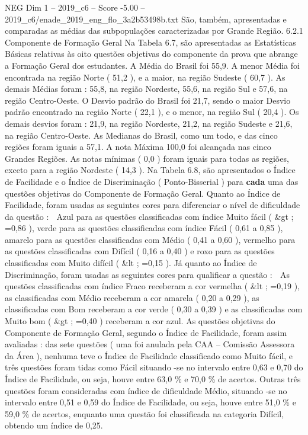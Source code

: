 \begin{textsample}{NEG Dim 1 – 2019\_c6 – Score -5.00 – 2019\_c6/enade\_2019\_eng\_flo\_3a2b53498b.txt}
São, também, apresentadas e comparadas as médias das subpopulações caracterizadas por Grande Região. 6.2.1 Componente de Formação Geral Na Tabela 6.7, são apresentadas as Estatísticas Básicas relativas às oito questões objetivas do componente da prova que abrange a Formação Geral dos estudantes.
A Média do Brasil foi 55,9.
A menor Média foi encontrada na região Norte ( 51,2 ), e a maior, na região Sudeste ( 60,7 ).
As demais Médias foram : 55,8, na região Nordeste, 55,6, na região Sul e 57,6, na região Centro-Oeste.
O Desvio padrão do Brasil foi 21,7, sendo o maior Desvio padrão encontrado na região Norte ( 22,1 ), e o menor, na região Sul ( 20,4 ).
Os demais desvios foram : 21,9, na região Nordeste, 21,2, na região Sudeste e 21,6, na região Centro-Oeste.
As Medianas do Brasil, como um todo, e das cinco regiões foram iguais a 57,1.
A nota Máxima 100,0 foi alcançada nas cinco Grandes Regiões.
As notas mínimas ( 0,0 ) foram iguais para todas as regiões, exceto para a região Nordeste ( 14,3 ).
Na Tabela 6.8, são apresentados o Índice de Facilidade e o Índice de Discriminação ( Ponto-Bisserial ) para \textbf{cada} uma das questões objetivas do Componente de Formação Geral.
Quanto ao Índice de Facilidade, foram usadas as seguintes cores para diferenciar o nível de dificuldade da questão :  Azul para as questões classificadas com índice Muito fácil ( \&gt ; =0,86 ), verde para as questões classificadas com índice Fácil ( 0,61 a 0,85 ), amarelo para as questões classificadas com Médio ( 0,41 a 0,60 ), vermelho para as questões classificadas com Difícil ( 0,16 a 0,40 ) e roxo para as questões classificadas com Muito difícil ( \&lt ; =0,15 ).
Já quanto ao Índice de Discriminação, foram usadas as seguintes cores para qualificar a questão :  As questões classificadas com índice Fraco receberam a cor vermelha ( \&lt ; =0,19 ), as classificadas com Médio receberam a cor amarela ( 0,20 a 0,29 ), as classificadas com Bom receberam a cor verde ( 0,30 a 0,39 ) e as classificadas com Muito bom ( \&gt ; =0,40 ) receberam a cor azul.
As questões objetivas do Componente de Formação Geral, segundo o Índice de Facilidade, foram assim avaliadas : das sete questões ( uma foi anulada pela CAA – Comissão Assessora da Área ), nenhuma teve o Índice de Facilidade classificado como Muito fácil, e três questões foram tidas como Fácil situando -se no intervalo entre 0,63 e 0,70 do Índice de Facilidade, ou seja, houve entre 63,0 \% e 70,0 \% de acertos.
Outras três questões foram consideradas com índice de dificuldade Médio, situando -se no intervalo entre 0,51 e 0,59 do Índice de Facilidade, ou seja, houve entre 51,0 \% e 59,0 \% de acertos, enquanto uma questão foi classificada na categoria Difícil, obtendo um índice de 0,25.

\end{textsample}
